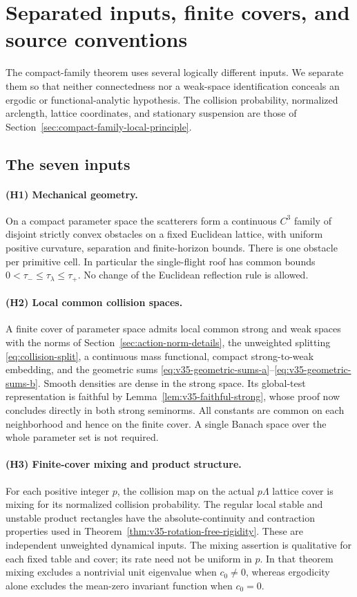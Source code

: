 \section{Separated inputs, finite covers, and source conventions}
\label{sec:v36-family-inputs}
The compact-family theorem uses several logically different inputs.
We separate them so that neither connectedness nor a weak-space
identification conceals an ergodic or functional-analytic hypothesis.
The collision probability, normalized arclength, lattice coordinates,
and stationary suspension are those of
Section~\ref{sec:compact-family-local-principle}.

\subsection{The seven inputs}
\paragraph{(H1) Mechanical geometry.}
On a compact parameter space the scatterers form a continuous $C^3$
family of disjoint strictly convex obstacles on a fixed Euclidean
lattice, with uniform positive curvature, separation and finite-horizon
bounds. There is one obstacle per primitive cell. In particular the
single-flight roof has common bounds $0<\tau_-\le\tau_\lambda\le\tau_+$.
No change of the Euclidean reflection rule is allowed.

\paragraph{(H2) Local common collision spaces.}
A finite cover of parameter space admits local common strong and weak
spaces with the norms of Section~\ref{sec:action-norm-details}, the
unweighted splitting \eqref{eq:collision-split}, a continuous mass
functional, compact strong-to-weak embedding, and the geometric sums
\eqref{eq:v35-geometric-sums-a}--\eqref{eq:v35-geometric-sums-b}.
Smooth densities are dense in the strong space. Its global-test
representation is faithful by Lemma~\ref{lem:v35-faithful-strong},
whose proof now concludes directly in both strong seminorms.
All constants are common on each neighborhood and hence on the finite
cover. A single Banach space over the whole parameter set is not required.

\paragraph{(H3) Finite-cover mixing and product structure.}
For each positive integer $p$, the collision map on the actual
$p\Lambda$ lattice cover is mixing for its normalized collision
probability. The regular local stable and unstable product rectangles
have the absolute-continuity and contraction properties used in
Theorem~\ref{thm:v35-rotation-free-rigidity}. These are independent
unweighted dynamical inputs. The mixing assertion is qualitative for
each fixed table and cover; its rate need not be uniform in $p$.
In that theorem mixing excludes a nontrivial unit eigenvalue when
$c_0\ne0$, whereas ergodicity alone excludes the mean-zero invariant
function when $c_0=0$.

